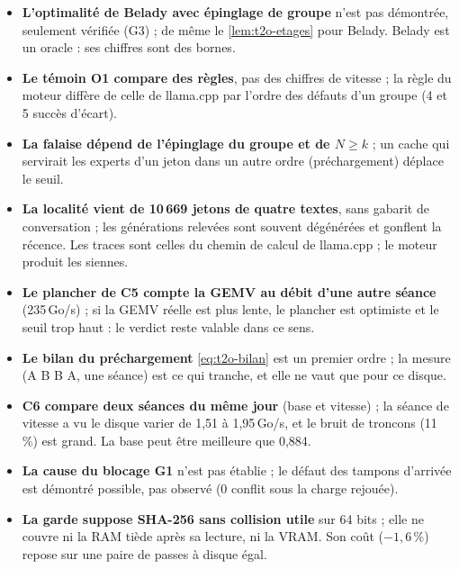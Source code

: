 \begin{faux}
\begin{itemize}
\item \textbf{L'optimalité de Belady avec épinglage de groupe} n'est pas démontrée, seulement vérifiée (G3) ; de même le \cref{lem:t2o-etages} pour Belady. Belady est un oracle : ses chiffres sont des bornes.
\item \textbf{Le témoin O1 compare des règles}, pas des chiffres de vitesse ; la règle du moteur diffère de celle de llama.cpp par l'ordre des défauts d'un groupe (4 et 5 succès d'écart).
\item \textbf{La falaise dépend de l'épinglage du groupe et de $N \ge k$} ; un cache qui servirait les experts d'un jeton dans un autre ordre (préchargement) déplace le seuil.
\item \textbf{La localité vient de 10\,669 jetons de quatre textes}, sans gabarit de conversation ; les générations relevées sont souvent dégénérées et gonflent la récence. Les traces sont celles du chemin de calcul de llama.cpp ; le moteur produit les siennes.
\item \textbf{Le plancher de C5 compte la GEMV au débit d'une autre séance} (235\,Go/s) ; si la GEMV réelle est plus lente, le plancher est optimiste et le seuil trop haut : le verdict reste valable dans ce sens.
\item \textbf{Le bilan du préchargement} \eqref{eq:t2o-bilan} est un premier ordre ; la mesure (A B B A, une séance) est ce qui tranche, et elle ne vaut que pour ce disque.
\item \textbf{C6 compare deux séances du même jour} (base et vitesse) ; la séance de vitesse a vu le disque varier de 1,51 à 1,95\,Go/s, et le bruit de troncons (11\,\%) est grand. La base peut être meilleure que 0,884.
\item \textbf{La cause du blocage G1} n'est pas établie ; le défaut des tampons d'arrivée est démontré possible, pas observé (0 conflit sous la charge rejouée).
\item \textbf{La garde suppose SHA-256 sans collision utile} sur 64 bits ; elle ne couvre ni la RAM tiède après sa lecture, ni la VRAM. Son coût ($-1{,}6\,\%$) repose sur une paire de passes à disque égal.
\end{itemize}
\end{faux}
